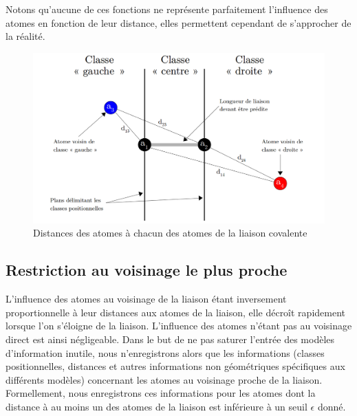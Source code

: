 \vspace{0.4cm}

\par Notons qu'aucune de ces fonctions ne représente parfaitement l'influence des atomes en fonction de leur distance, elles permettent cependant de s'approcher de la réalité.

\vspace{1cm}

\begin{figure}[!h]
	\centering
	\includegraphics[scale=0.28]{images/classes_pos_2.png}
	\caption{Distances des atomes à chacun des atomes de la liaison covalente}
\end{figure}


\subsection{Restriction au voisinage le plus proche}
\par L'influence des atomes au voisinage de la liaison étant inversement proportionnelle à leur distances aux atomes de la liaison, elle décroît rapidement lorsque l'on s'éloigne de la liaison. L'influence des atomes n'étant pas au voisinage direct est ainsi négligeable. Dans le but de ne pas saturer l'entrée des modèles d'information inutile, nous n'enregistrons alors que les informations (classes positionnelles, distances et autres informations non géométriques spécifiques aux différents modèles) concernant les atomes au voisinage proche de la liaison. Formellement, nous enregistrons ces informations pour les atomes dont la distance à au moins un des atomes de la liaison est inférieure à un seuil $\epsilon$  donné.\\

\vspace{1cm}

